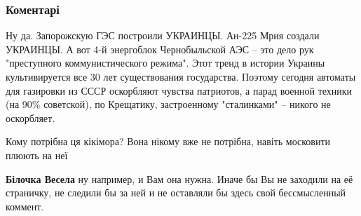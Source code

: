  
 
 
 
 
\subsubsection{Коментарі}

\begin{itemize} %
 
Ну да.
Запорожскую ГЭС построили УКРАИНЦЫ.
Ан-225 Мрия создали УКРАИНЦЫ.
А вот 4-й энергоблок Чернобыльской АЭС – это дело рук "преступного коммунистического режима".
Этот тренд в истории Украины культивируется все 30 лет существования государства.
Поэтому сегодня автоматы для газировки из СССР оскорбляют чувства патриотов, а
парад военной техники (на 90\% советской), по Крещатику, застроенному
"сталинками" – никого не оскорбляет.

 
Кому потрібна ця кікімора? Вона нікому вже не потрібна, навіть московити плюють на неї
\begin{itemize} %
 
\textbf{Білочка Весела} ну например, и Вам она нужна. Иначе бы Вы не заходили
на её страничку, не следили бы за ней и не оставляли бы здесь свой
бессмысленный коммент.
\end{itemize} %

 

\end{itemize}
